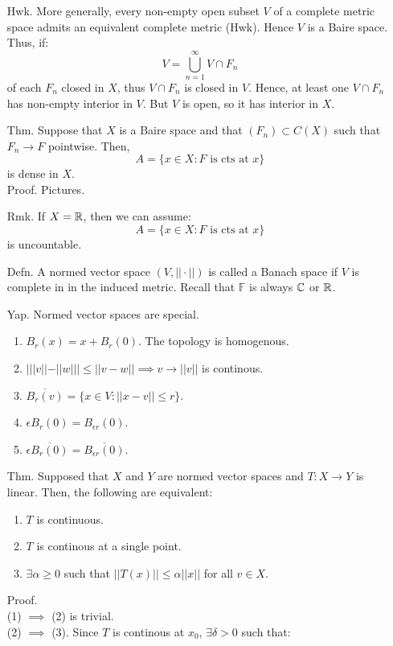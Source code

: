 \documentclass[12pt]{article}
\begin{document}
\begin{itemize}
    \item[Hwk.] More generally, every non-empty open subset $V$ of a complete metric space admits an equivalent complete metric (Hwk). Hence $V$ is a Baire space. Thus, if:
    \[ V = \bigcup_{n=1}^\infty V \cap F_n \]
    of each $F_n$ closed in $X$, thus $V \cap F_n$ is closed in $V$. Hence, at least one $V \cap F_n$ has non-empty interior in $V$. But $V$ is open, so it has interior in $X$.
    \item[Thm.] Suppose that $X$ is a Baire space and that $(F_n) \subset C(X)$ such that $F_n \to F$ pointwise. Then,
    \[ A = \{x \in X : F \text{ is cts at $x$}\}\]
    is dense in $X$. \\
    Proof. Pictures. 
    \item[Rmk.] If $X = \mathbb R$, then we can assume: 
    \[ A = \{x \in X: F \text{ is cts at $x$}\}\]
    is uncountable. 
    \item[Defn.] A normed vector space $(V, ||\cdot||)$ is called a Banach space if $V$ is complete in in the induced metric. Recall that $\mathbb{F}$ is always $\mathbb C$ or $\mathbb R$.  
    \item[Yap.] Normed vector spaces are special. 
    \begin{enumerate}
        \item $B_r(x) = x + B_r(0)$. The topology is homogenous. 
        \item $| ||v|| - ||w|| | \leq ||v - w|| \implies v \to ||v||$ is continous.
        \item $\overline{B_r(v)} = \{x \in V : ||x-v|| \leq r\}$. 
        \item $\epsilon B_r(0) = B_{\epsilon r}(0)$. 
        \item $\epsilon \overline{B_r(0)} = \overline{B_{\epsilon r}(0)}$.
    \end{enumerate} 
    \item[Thm.] Supposed that $X$ and $Y$ are normed vector spaces and $T: X \to Y$ is linear. Then, the following are equivalent: 
    \begin{enumerate}
        \item $T$ is continuous.
        \item $T$ is continous at a single point.
        \item $\exists \alpha \geq 0$ such that $||T(x)|| \leq \alpha ||x||$ for all $v \in X$. 
    \end{enumerate}
    Proof. \\
    (1) $\implies$ (2) is trivial. \\
    (2) $\implies$ (3). Since $T$ is continous at $x_0$, $\exists \delta > 0$ such that: 

\end{itemize}
\end{document}
